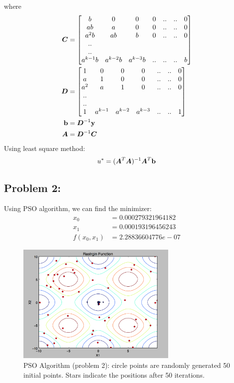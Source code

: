 \documentclass{article}
\begin{document}
where \begin{align*}  
\boldsymbol{C} &= \begin{bmatrix} b& 0& 0& 0& ..& ..& 0 \\ab& a& 0& 0& ..& ..& 0 \\a^2 b& ab& b& 0& ..& ..& 0\\ .. \\ .. \\ a^{k-1}b& a^{k-2}b& a^{k-3}b& ..& ..& ..& b   \end{bmatrix}\\
\boldsymbol{D} & = \begin{bmatrix} 1& 0& 0& 0& ..& ..& 0 \\a& 1& 0& 0& ..& ..& 0 \\a^2& a& 1& 0& ..& ..& 0 \\ .. \\ .. \\ 1& a^{k-1}& a^{k-2} & a^{k-3} & ..& ..& 1  \end{bmatrix}\\
\boldsymbol{\mathrm{b}} &= \boldsymbol{D}^{-1}\boldsymbol{\mathrm{y}}\\
\boldsymbol{A} & = \boldsymbol{D}^{-1}\boldsymbol{C}
\end{align*}
Using least square method: \begin{align*} 
u^{*} = (\boldsymbol{A}^{T}\boldsymbol{A})^{-1}\boldsymbol{A}^T\boldsymbol{\mathrm{b}} 
\end{align*}


\subsection*{{Problem 2: }}

Using PSO algorithm, we can find the minimizer: \\
\begin{align*}
x_0 & = 0.000279321964182 \\
x_1 & = 0.000193196456243 \\
f(x_0,x_1) & =  2.28836604776e-07
\end{align*}

\begin{figure}[h]
\includegraphics[width=0.7\textwidth]{PSO} 
\centering
\caption{PSO Algorithm (problem 2): circle points are randomly generated 50 initial points. Stars indicate the positions after 50 iterations. }

\end{figure}
\end{document}

